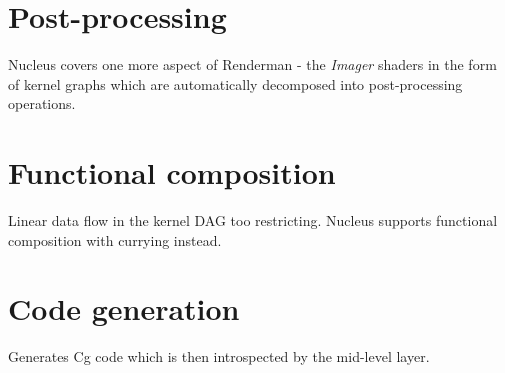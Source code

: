 \section{Post-processing}

Nucleus covers one more aspect of Renderman - the \emph{Imager} shaders in the form of kernel graphs which are automatically decomposed into post-processing operations.

\section{Functional composition}

Linear data flow in the kernel DAG too restricting. Nucleus supports functional composition with currying instead.

\section{Code generation}

Generates Cg code which is then introspected by the mid-level layer.
